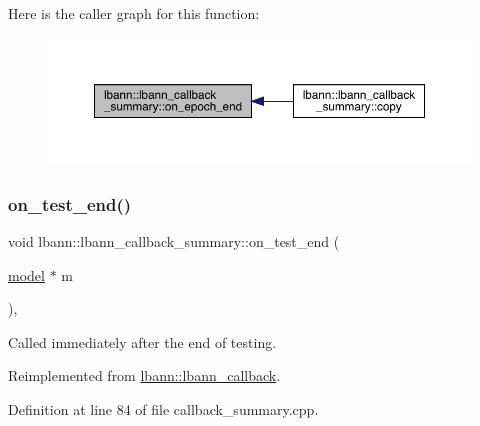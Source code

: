Here is the caller graph for this function\+:\nopagebreak
\begin{figure}[H]
\begin{center}
\leavevmode
\includegraphics[width=350pt]{classlbann_1_1lbann__callback__summary_a404e64dcedfcba611510379f99dcace9_icgraph}
\end{center}
\end{figure}
\mbox{\label{classlbann_1_1lbann__callback__summary_a8dced0a202df3daaece138a7b958e544}} 
\subsubsection{\texorpdfstring{on\+\_\+test\+\_\+end()}{on\_test\_end()}}
{\footnotesize\ttfamily void lbann\+::lbann\+\_\+callback\+\_\+summary\+::on\+\_\+test\+\_\+end (\begin{DoxyParamCaption}\item[{\hyperlink{classlbann_1_1model}{model} $\ast$}]{m }\end{DoxyParamCaption})\hspace{0.3cm}{\ttfamily [override]}, {\ttfamily [virtual]}}

Called immediately after the end of testing. 

Reimplemented from \hyperlink{classlbann_1_1lbann__callback_accbad4dd004c1ced33642db6398b2efe}{lbann\+::lbann\+\_\+callback}.



Definition at line 84 of file callback\+\_\+summary.\+cpp.


